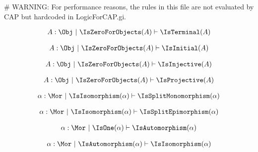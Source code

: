 # WARNING: For performance reasons, the rules in this file are not evaluated by CAP but hardcoded in LogicForCAP.gi.

\begin{sequent}
\begin{align*}
  A:\Obj ~|~ \IsZeroForObjects( A ) \vdash \IsTerminal( A )
\end{align*}
\end{sequent}

\begin{sequent}
\begin{align*}
  A:\Obj ~|~ \IsZeroForObjects( A ) \vdash \IsInitial( A )
\end{align*}
\end{sequent}

\begin{sequent}
\begin{align*}
  A:\Obj ~|~ \IsZeroForObjects( A ) \vdash \IsInjective( A )
\end{align*}
\end{sequent}

\begin{sequent}
\begin{align*}
  A:\Obj ~|~ \IsZeroForObjects( A ) \vdash \IsProjective( A )
\end{align*}
\end{sequent}

\begin{sequent}
\begin{align*}
  \alpha:\Mor ~|~ \IsIsomorphism( \alpha ) \vdash \IsSplitMonomorphism( \alpha )
\end{align*}
\end{sequent}

\begin{sequent}
\begin{align*}
  \alpha:\Mor ~|~ \IsIsomorphism( \alpha ) \vdash \IsSplitEpimorphism( \alpha )
\end{align*}
\end{sequent}

\begin{sequent}
\begin{align*}
  \alpha:\Mor ~|~ \IsOne( \alpha ) \vdash \IsAutomorphism( \alpha )
\end{align*}
\end{sequent}

\begin{sequent}
\begin{align*}
  \alpha:\Mor ~|~ \IsAutomorphism( \alpha ) \vdash \IsIsomorphism( \alpha )
\end{align*}
\end{sequent}

